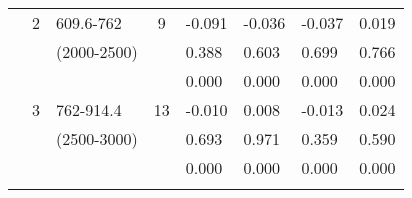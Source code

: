 \begin{table}[p]
\begin{tabular}{cclcllll}
                                                               &  2                                                             & 609.6-762                                                              & 9                                                                     &  -0.091                                     & -0.036                                         & -0.037                                             & 0.019  \\ 
                                                               &                                                                 & (2000-2500)                                                           &                                                                        &  0.388                                      & 0.603                                           & 0.699                                              & 0.766  \\ 
                                                               &                                                                 &                                                                                &                                                                        &  0.000                                      & 0.000                                           & 0.000                                              & 0.000  \\ \cline{5-8}\noalign{\smallskip}
                                                               & 3                                                              & 762-914.4                                                              & 13                                                                   & -0.010                                      & 0.008                                           & -0.013                                             & 0.024  \\ 
                                                               &                                                                 & (2500-3000)                                                           &                                                                        & 0.693                                       & 0.971                                           & 0.359                                              & 0.590 \\
                                                               &                                                                 &                                                                                &                                                                        &  0.000                                      & 0.000                                           & 0.000                                              & 0.000  \\ \cline{5-8}\noalign{\smallskip}

\end{tabular}
\end{table}
